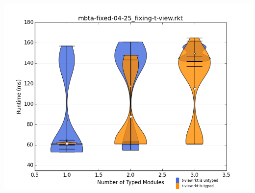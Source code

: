 \documentclass{article}
\begin{document}
\includegraphics[width=\textwidth]{mbta-fixed-04-25_fixing-t-view.rkt-dv.png}
\end{document}
